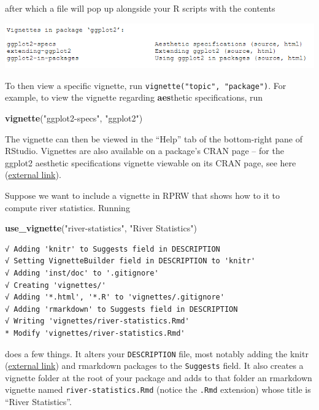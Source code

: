 \documentclass[
]{book}
\newenvironment{Shaded}{\begin{snugshade}}{\end{snugshade}}
\newcommand{\KeywordTok}[1]{\textcolor[rgb]{0.13,0.29,0.53}{\textbf{#1}}}
\newcommand{\NormalTok}[1]{#1}
\newcommand{\StringTok}[1]{\textcolor[rgb]{0.31,0.60,0.02}{#1}}
\begin{document}
after which a file will pop up alongside your R scripts with the contents

\includegraphics[width=1\linewidth]{images/newrpack_files6}

To then view a specific vignette, run \texttt{vignette("topic",\ "package")}. For example, to view the vignette regarding \textbf{aes}thetic specifications, run

\begin{Shaded}
\begin{Highlighting}[]
\KeywordTok{vignette}\NormalTok{(}\StringTok{"ggplot2-specs"}\NormalTok{, }\StringTok{"ggplot2"}\NormalTok{)}
\end{Highlighting}
\end{Shaded}

The vignette can then be viewed in the ``Help'' tab of the bottom-right pane of RStudio. Vignettes are also available on a package's CRAN page -- for the ggplot2 aesthetic specifications vignette viewable on its CRAN page, see here (\href{https://cran.r-project.org/web/packages/ggplot2/vignettes/ggplot2-specs.html}{external link}).

Suppose we want to include a vignette in RPRW that shows how to it to compute river statistics. Running

\begin{Shaded}
\begin{Highlighting}[]
\KeywordTok{use_vignette}\NormalTok{(}\StringTok{"river-statistics"}\NormalTok{, }\StringTok{"River Statistics"}\NormalTok{)}
\end{Highlighting}
\end{Shaded}

\begin{verbatim}
√ Adding 'knitr' to Suggests field in DESCRIPTION
√ Setting VignetteBuilder field in DESCRIPTION to 'knitr'
√ Adding 'inst/doc' to '.gitignore'
√ Creating 'vignettes/'
√ Adding '*.html', '*.R' to 'vignettes/.gitignore'
√ Adding 'rmarkdown' to Suggests field in DESCRIPTION
√ Writing 'vignettes/river-statistics.Rmd'
* Modify 'vignettes/river-statistics.Rmd'
\end{verbatim}

does a few things. It alters your \texttt{DESCRIPTION} file, most notably adding the knitr (\href{https://yihui.org/knitr/}{external link}) and rmarkdown packages to the \texttt{Suggests} field. It also creates a vignette folder at the root of your package and adds to that folder an rmarkdown vignette named \texttt{river-statistics.Rmd} (notice the \texttt{.Rmd} extension) whose title is ``River Statistics''.
\end{document}
